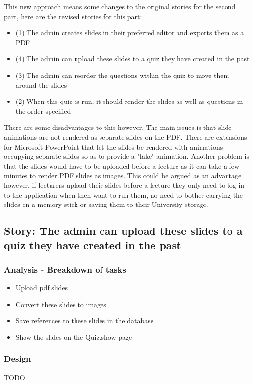 This new approach means some changes to the original stories for the second part, here are the revised stories for this part:
\begin{itemize}
	\item (1) The admin creates slides in their preferred editor and exports them as a PDF
	\item (4) The admin can upload these slides to a quiz they have created in the past
	\item (3) The admin can reorder the questions within the quiz to move them around the slides
	\item (2) When this quiz is run, it should render the slides as well as questions in the order specified
\end{itemize}

There are some disadvantages to this however. The main issues is that slide animations are not rendered as separate slides on the PDF. There are extensions for Microsoft PowerPoint that let the slides be rendered with animations occupying separate slides so as to provide a "fake" animation. Another problem is that the slides would have to be uploaded before a lecture as it can take a few minutes to render PDF slides as images. This could be argued as an advantage however, if lecturers upload their slides before a lecture they only need to log in to the application when then want to run them, no need to bother carrying the slides on a memory stick or saving them to their University storage.
\newpage

\subsection{Story: The admin can upload these slides to a quiz they have created in the past}
\subsubsection{Analysis - Breakdown of tasks}
\begin{itemize}
	\item Upload pdf slides
	\item Convert these slides to images
	\item Save references to these slides in the database
	\item Show the slides on the Quiz.show page
\end{itemize}
\subsubsection{Design}
TODO
